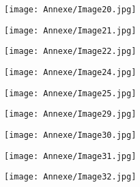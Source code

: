     \begin{figure}[H]
   \centering
   \texttt{[image: Annexe/Image20.jpg]}
	\caption{\cite{journallimbour}}\label{fig:limbour2}
    \end{figure}


    \begin{figure}[H]
   \centering
   \texttt{[image: Annexe/Image21.jpg]}
	\caption{\cite{avantgarde}}\label{fig:avantgardemasson}
    \end{figure}


    \begin{figure}[H]
   \centering
   \texttt{[image: Annexe/Image22.jpg]}
	\caption{\cite{nouvelleformule}}\label{fig:formule2}
    \end{figure}

    \begin{figure}[H]
   \centering
   \texttt{[image: Annexe/Image24.jpg]}
	\caption{\cite{reelfantastique}}\label{fig:reelfantastique}
    \end{figure}


    \begin{figure}[H]
   \centering
   \texttt{[image: Annexe/Image25.jpg]}
	\caption{\cite{peindrefinjeu}}\label{fig:peindrefinjeu}
    \end{figure}

    \begin{figure}[H]
   \centering
   \texttt{[image: Annexe/Image29.jpg]}
	\caption{\cite{reelfantastique}}\label{fig:reelfantastique2}
    \end{figure}


    \begin{figure}[H]
   \centering
   \texttt{[image: Annexe/Image30.jpg]}
	\caption{\cite{nouvelleformule}}\label{fig:nouvelleformule2}
    \end{figure}


    \begin{figure}[H]
   \centering
   \texttt{[image: Annexe/Image31.jpg]}
	\caption{\cite{salondemai}}\label{fig:salondemai}
    \end{figure}


    \begin{figure}[H]
   \centering
   \texttt{[image: Annexe/Image32.jpg]}
	\caption{\cite{savoiraimer
    }}\label{fig:savoiraimer}
    \end{figure}



